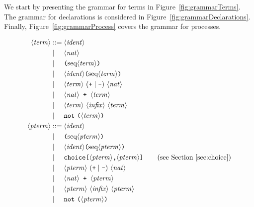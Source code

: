 \documentclass{book}
\newcommand{\nonterm}[1]{\langle\mathit{#1}\rangle}
\newcommand{\seq}[1]{\textrm{seq}\nonterm{#1}}
\begin{document}
We start by presenting the grammar for terms in Figure~\ref{fig:grammarTerms}.
The grammar for declarations is considered in Figure~\ref{fig:grammarDeclarations}. Finally, Figure~\ref{fig:grammarProcess} covers the grammar for processes.



\begin{figure}
\begin{align*}
\nonterm{term} &::=
	\nonterm{ident}\\
&\mid\phantom{:=}
	\nonterm{nat}\\
&\mid\phantom{:=}
	\texttt{(}\seq{term}\texttt{)}\\
&\mid\phantom{:=}
	\nonterm{ident}\texttt{(}\seq{term}\texttt{)}\\
&\mid\phantom{:=}
       \nonterm{term}\ (\texttt{+} \mid \texttt{-})\ \nonterm{nat}\\
&\mid\phantom{:=}
       \nonterm{nat} \texttt{ + }\nonterm{term}\\
&\mid\phantom{:=}
       \nonterm{term}\ \nonterm{infix}\ \nonterm{term}\\
&\mid\phantom{:=}
       \texttt{not}\ \texttt{(} \nonterm{term} \texttt{)}\\
%
\nonterm{pterm} &::=
	\nonterm{ident}\\
&\mid\phantom{:=}
	\texttt{(}\seq{pterm}\texttt{)}\\
&\mid\phantom{:=}
	\nonterm{ident}\texttt{(}\seq{pterm}\texttt{)}\\
&\mid\phantom{:=}
	\texttt{choice[} \nonterm{pterm} \texttt{,} \nonterm{pterm} \texttt{]}\tag{see Section~\ref{sec:choice}}\\
&\mid\phantom{:=}
       \nonterm{pterm}\ (\texttt{+} \mid \texttt{-})\ \nonterm{nat}\\
&\mid\phantom{:=}
       \nonterm{nat} \texttt{ + }\nonterm{pterm}\\
&\mid\phantom{:=}
       \nonterm{pterm}\ \nonterm{infix}\ \nonterm{pterm}\\
&\mid\phantom{:=}
       \texttt{not}\ \texttt{(} \nonterm{pterm} \texttt{)}\\

\end{align*}
\end{figure}
\end{document}
